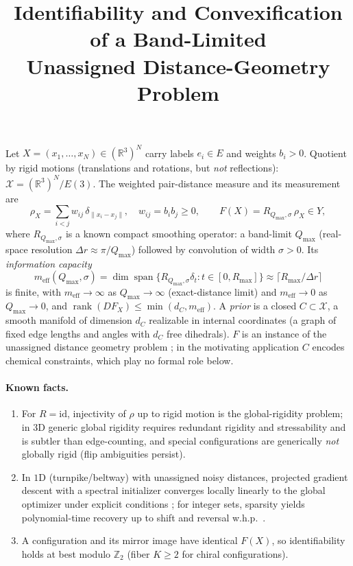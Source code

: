 \documentclass[11pt]{article}
\title{Identifiability and Convexification of a Band-Limited \\
Unassigned Distance-Geometry Problem}
\author{}
\date{}
\begin{document}
\maketitle

Let $X=(x_1,\dots,x_N)\in(\mathbb{R}^3)^N$ carry labels $e_i\in E$ and weights
$b_i>0$. Quotient by rigid motions (translations and rotations, but
\emph{not} reflections):
$\mathcal{X}=(\mathbb{R}^3)^N/E(3)$.
The weighted pair-distance measure and its measurement are
\[
  \rho_X=\sum_{i<j} w_{ij}\,\delta_{\|x_i-x_j\|},\quad w_{ij}=b_i b_j\ge 0,
  \qquad
  F(X)=R_{Q_{\max},\sigma}\,\rho_X\in Y,
\]
where $R_{Q_{\max},\sigma}$ is a known compact smoothing operator: a
band-limit $Q_{\max}$ (real-space resolution $\Delta r\approx\pi/Q_{\max}$)
followed by convolution of width $\sigma>0$. Its \emph{information capacity}
\[
  m_{\mathrm{eff}}(Q_{\max},\sigma)
  =\dim\operatorname{span}\{R_{Q_{\max},\sigma}\delta_t:t\in[0,R_{\max}]\}
  \approx\lceil R_{\max}/\Delta r\rceil
\]
is finite, with $m_{\mathrm{eff}}\to\infty$ as $Q_{\max}\to\infty$
(exact-distance limit) and $m_{\mathrm{eff}}\to 0$ as $Q_{\max}\to 0$, and
$\operatorname{rank}(DF_X)\le\min(d_C,m_{\mathrm{eff}})$.
A \emph{prior} is a closed $C\subset\mathcal{X}$, a smooth manifold of
dimension $d_C$ realizable in internal coordinates (a graph of fixed edge
lengths and angles with $d_C$ free dihedrals). $F$ is an instance of the
unassigned distance geometry problem \cite{Billinge2018}; in the motivating
application $C$ encodes chemical constraints, which play no formal role below.

\paragraph{Known facts.}
\begin{enumerate}
\item For $R=\mathrm{id}$, injectivity of $\rho$ up to rigid motion is the
global-rigidity problem; in $3$D generic global rigidity requires redundant
rigidity and stressability and is subtler than edge-counting, and special
configurations are generically \emph{not} globally rigid (flip ambiguities
persist).
\item In $1$D (turnpike/beltway) with unassigned noisy distances, projected
gradient descent with a spectral initializer converges locally linearly to
the global optimizer under explicit conditions \cite{HuangDokmanic2021}; for
integer sets, sparsity yields polynomial-time recovery up to shift and
reversal w.h.p.\ \cite{JaganathanHassibi2012}.
\item A configuration and its mirror image have identical $F(X)$, so
identifiability holds at best modulo $\mathbb{Z}_2$ (fiber $K\ge2$ for chiral
configurations).
\end{enumerate}
\end{document}
